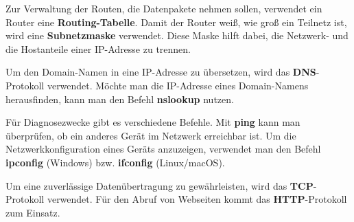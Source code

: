 \begin{myexercise}
\begin{myanswer}
        Zur Verwaltung der Routen, die Datenpakete nehmen sollen, verwendet ein Router eine \textbf{Routing-Tabelle}. Damit der Router weiß, wie groß ein Teilnetz ist, wird eine \textbf{Subnetzmaske} verwendet. Diese Maske hilft dabei, die Netzwerk- und die Hostanteile einer IP-Adresse zu trennen.

        Um den Domain-Namen in eine IP-Adresse zu übersetzen, wird das \textbf{DNS}-Protokoll verwendet. Möchte man die IP-Adresse eines Domain-Namens herausfinden, kann man den Befehl \textbf{nslookup} nutzen.  

        Für Diagnosezwecke gibt es verschiedene Befehle. Mit \textbf{ping} kann man überprüfen, ob ein anderes Gerät im Netzwerk erreichbar ist. Um die Netzwerkkonfiguration eines Geräts anzuzeigen, verwendet man den Befehl \textbf{ipconfig} (Windows) bzw. \textbf{ifconfig} (Linux/macOS).

        Um eine zuverlässige Datenübertragung zu gewährleisten, wird das \textbf{TCP}-Protokoll verwendet. Für den Abruf von Webseiten kommt das \textbf{HTTP}-Protokoll zum Einsatz.
    \end{myanswer}
\end{myexercise}


